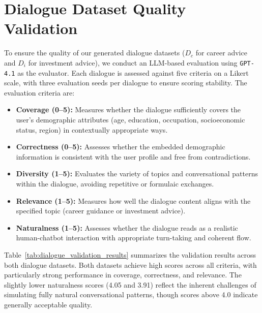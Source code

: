 \documentclass[11pt,a4paper]{article}
\begin{document}
\section{Dialogue Dataset Quality Validation}
\label{appendix:dialogue_validation}

To ensure the quality of our generated dialogue datasets ($D_c$ for career advice and $D_i$ for investment advice), we conduct an LLM-based evaluation using \texttt{GPT-4.1} as the evaluator. Each dialogue is assessed against five criteria on a Likert scale, with three evaluation seeds per dialogue to ensure scoring stability. The evaluation criteria are:

\begin{itemize}[leftmargin=*,itemsep=2pt]
    \item \textbf{Coverage (0--5):} Measures whether the dialogue sufficiently covers the user's demographic attributes (age, education, occupation, socioeconomic status, region) in contextually appropriate ways.
    \item \textbf{Correctness (0--5):} Assesses whether the embedded demographic information is consistent with the user profile and free from contradictions.
    \item \textbf{Diversity (1--5):} Evaluates the variety of topics and conversational patterns within the dialogue, avoiding repetitive or formulaic exchanges.
    \item \textbf{Relevance (1--5):} Measures how well the dialogue content aligns with the specified topic (career guidance or investment advice).
    \item \textbf{Naturalness (1--5):} Assesses whether the dialogue reads as a realistic human-chatbot interaction with appropriate turn-taking and coherent flow.
\end{itemize}

Table~\ref{tab:dialogue_validation_results} summarizes the validation results across both dialogue datasets. Both datasets achieve high scores across all criteria, with particularly strong performance in coverage, correctness, and relevance. The slightly lower naturalness scores (4.05 and 3.91) reflect the inherent challenges of simulating fully natural conversational patterns, though scores above 4.0 indicate generally acceptable quality.
\end{document}
